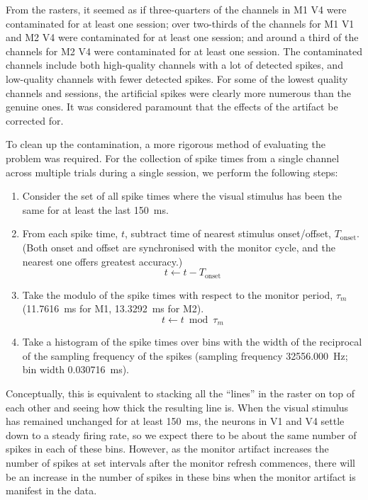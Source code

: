 From the rasters, it seemed as if three-quarters of the channels in \ac{M1} \ac{V4} were contaminated for at least one session; over two-thirds of the channels for \ac{M1} \ac{V1} and \ac{M2} \ac{V4} were contaminated for at least one session; and around a third of the channels for \ac{M2} \ac{V4} were contaminated for at least one session.
The contaminated channels include both high-quality channels with a lot of detected spikes, and low-quality channels with fewer detected spikes.
For some of the lowest quality channels and sessions, the artificial spikes were clearly more numerous than the genuine ones.
It was considered paramount that the effects of the artifact be corrected for.

To clean up the contamination, a more rigorous method of evaluating the problem was required.
For the collection of spike times from a single channel across multiple trials during a single session, we perform the following steps:
\begin{enumerate}
\item Consider the set of all spike times where the visual stimulus has been the same for at least the last \SI{150}{ms}.
\item From each spike time, $t$, subtract time of nearest stimulus onset/offset, $T_{\text{onset}}$.
      (Both onset and offset are synchronised with the monitor cycle, and the nearest one offers greatest accuracy.)
$$
t \leftarrow t - T_{\text{onset}}
$$
\item Take the modulo of the spike times with respect to the monitor period, $\tau_m$ (\SI{11.7616}{ms} for \ac{M1}, \SI{13.3292}{ms} for \ac{M2}).
$$
t \leftarrow t \bmod \tau_m
$$
\item Take a histogram of the spike times over bins with the width of the reciprocal of the sampling frequency of the spikes (sampling frequency \SI{32556.000}{Hz}; bin width \SI{0.030716}{ms}).
\end{enumerate}
Conceptually, this is equivalent to stacking all the ``lines'' in the raster on top of each other and seeing how thick the resulting line is.
When the visual stimulus has remained unchanged for at least \SI{150}{ms}, the neurons in \ac{V1} and \ac{V4} settle down to a steady firing rate, so we expect there to be about the same number of spikes in each of these bins.
However, as the monitor artifact increases the number of spikes at set intervals after the monitor refresh commences, there will be an increase in the number of spikes in these bins when the monitor artifact is manifest in the data.

